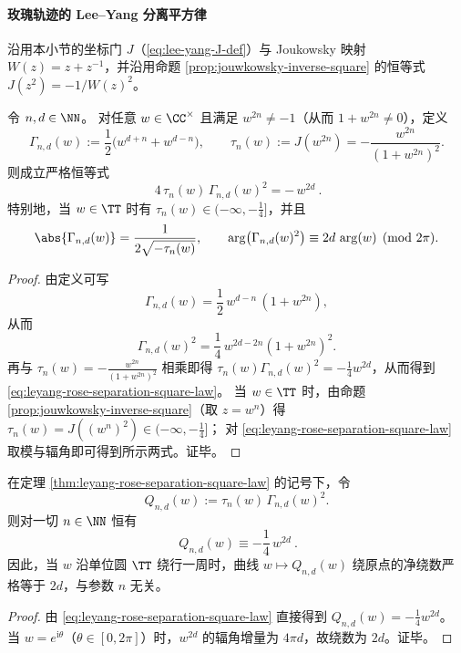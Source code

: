 \paragraph{玫瑰轨迹的 Lee--Yang 分离平方律}
沿用本小节的坐标门 \(J\)（\eqref{eq:lee-yang-J-def}）与 Joukowsky 映射 \(W(z)=z+z^{-1}\)，并沿用命题 \ref{prop:jouwkowsky-inverse-square} 的恒等式 \(J(z^2)=-1/W(z)^2\)。

\begin{theorem}\label{thm:leyang-rose-separation-square-law}
令 \(n,d\in\NN\)。
对任意 \(w\in\CC^{\times}\) 且满足 \(w^{2n}\neq -1\)（从而 \(1+w^{2n}\neq 0\)），定义
\[
\Gamma_{n,d}(w):=\frac12\bigl(w^{d+n}+w^{d-n}\bigr),\qquad
\tau_n(w):=J(w^{2n})=-\frac{w^{2n}}{(1+w^{2n})^2}.
\]
则成立严格恒等式
\begin{equation}\label{eq:leyang-rose-separation-square-law}
\boxed{\ 4\,\tau_n(w)\,\Gamma_{n,d}(w)^2=-\,w^{2d}\ }.
\end{equation}
特别地，当 \(w\in\TT\) 时有 \(\tau_n(w)\in(-\infty,-\tfrac14]\)，并且
\[
\abs{\Gamma_{n,d}(w)}=\frac{1}{2\sqrt{-\tau_n(w)}},
\qquad
\arg\bigl(\Gamma_{n,d}(w)^2\bigr)\equiv 2d\,\arg(w)\pmod{2\pi}.
\]
\end{theorem}
\begin{proof}
由定义可写
\[
\Gamma_{n,d}(w)=\frac12\,w^{d-n}\,(1+w^{2n}),
\]
从而
\[
\Gamma_{n,d}(w)^2=\frac14\,w^{2d-2n}(1+w^{2n})^2.
\]
再与 \(\tau_n(w)=-\frac{w^{2n}}{(1+w^{2n})^2}\) 相乘即得
\(
\tau_n(w)\Gamma_{n,d}(w)^2=-\frac14 w^{2d}
\)，从而得到 \eqref{eq:leyang-rose-separation-square-law}。
当 \(w\in\TT\) 时，由命题 \ref{prop:jouwkowsky-inverse-square}（取 \(z=w^n\)）得 \(\tau_n(w)=J((w^n)^2)\in(-\infty,-\tfrac14]\)；
对 \eqref{eq:leyang-rose-separation-square-law} 取模与辐角即可得到所示两式。证毕。
\end{proof}

\begin{corollary}[关于 \(n\) 的守恒量]\label{cor:leyang-rose-n-invariant}
在定理 \ref{thm:leyang-rose-separation-square-law} 的记号下，令
\[
Q_{n,d}(w):=\tau_n(w)\,\Gamma_{n,d}(w)^2.
\]
则对一切 \(n\in\NN\) 恒有
\[
\boxed{\ Q_{n,d}(w)\equiv-\frac14\,w^{2d}\ }.
\]
因此，当 \(w\) 沿单位圆 \(\TT\) 绕行一周时，曲线 \(w\mapsto Q_{n,d}(w)\) 绕原点的净绕数严格等于 \(2d\)，与参数 \(n\) 无关。
\end{corollary}
\begin{proof}
由 \eqref{eq:leyang-rose-separation-square-law} 直接得到 \(Q_{n,d}(w)=-\frac14 w^{2d}\)。
当 \(w=e^{\mathrm{i}\theta}\)（\(\theta\in[0,2\pi]\)）时，\(w^{2d}\) 的辐角增量为 \(4\pi d\)，故绕数为 \(2d\)。证毕。
\end{proof}

